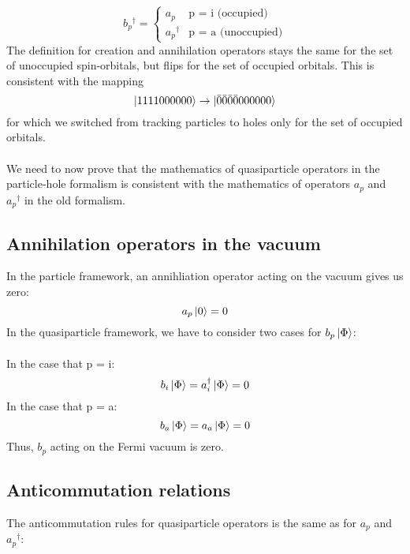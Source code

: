 \documentclass{article}
\newcommand{\kphi}{\ensuremath{\ket{\Phi}} }
\newcommand{\dg}{\ensuremath{^\dagger} }
\begin{document}
\[
  b_p\dg =
    \begin{cases}
      a_p & \text{p = i (occupied)}\\
      a_p\dg & \text{p = a (unoccupied)}
    \end{cases}       
\]
The definition for creation and annihilation operators stays the same for the set of unoccupied spin-orbitals, but flips for the set of occupied orbitals.
This is consistent with the mapping 
\[ \ket{1111000000} \rightarrow  \ket{\bar{0}\bar{0}\bar{0}\bar{0}000000} \]
for which we switched from tracking particles to holes only for the set of occupied orbitals. 
\\ \\
We need to now prove that the mathematics of quasiparticle operators in the particle-hole formalism 
is consistent with the mathematics of operators $a_p$ and $a_p\dg$ in the old formalism. 
\subsection{Annihilation operators in the vacuum}
In the particle framework, an annihliation operator acting on the vacuum gives us zero:
\[a_p \ket{0} = 0 \]
In the quasiparticle framework, we have to consider two cases for $b_p \kphi$: 
\\ \\
In the case that p = i:
\[ b_i \ket{\Phi} = a_i\dg  \ket{\Phi}  = 0     \]
In the case that p = a: 
\[ b_a \ket{\Phi} = a_a  \ket{\Phi}  = 0     \]
Thus, $b_p$ acting on the Fermi vacuum is zero. 

\subsection{Anticommutation relations}

The anticommutation rules for quasiparticle operators is the same as for $a_p$ and $a_p\dg$:
\end{document}
